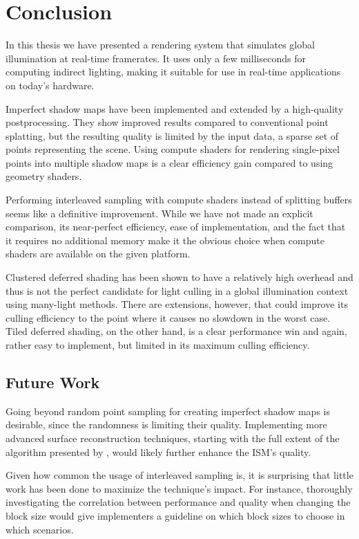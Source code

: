 

\chapter{Conclusion}
\label{chap:conclusion}

In this thesis we have presented a rendering system that simulates global illumination at real-time framerates. It uses only a few milliseconds for computing indirect lighting, making it suitable for use in real-time applications on today's hardware.

Imperfect shadow maps have been implemented and extended by a high-quality postprocessing. They show improved results compared to conventional point splatting, but the resulting quality is limited by the input data, a sparse set of points representing the scene. Using compute shaders for rendering single-pixel points into multiple shadow maps is a clear efficiency gain compared to using geometry shaders.

Performing interleaved sampling with compute shaders instead of splitting buffers seems like a definitive improvement. While we have not made an explicit comparison, its near-perfect efficiency, ease of implementation, and the fact that it requires no additional memory make it the obvious choice when compute shaders are available on the given platform.

Clustered deferred shading has been shown to have a relatively high overhead and thus is not the perfect candidate for light culling in a global illumination context using many-light methods. There are extensions, however, that could improve its culling efficiency to the point where it causes no slowdown in the worst case. Tiled deferred shading, on the other hand, is a clear performance win and again, rather easy to implement, but limited in its maximum culling efficiency.

\section{Future Work}

Going beyond random point sampling for creating imperfect shadow maps is desirable, since the randomness is limiting their quality. Implementing more advanced surface reconstruction techniques, starting with the full extent of the algorithm presented by \citet{Marroquim:2007:reconstruction}, would likely further enhance the ISM's quality.

Given how common the usage of interleaved sampling is, it is surprising that little work has been done to maximize the technique's impact. For instance, thoroughly investigating the correlation between performance and quality when changing the block size would give implementers a guideline on which block sizes to choose in which scenarios.

